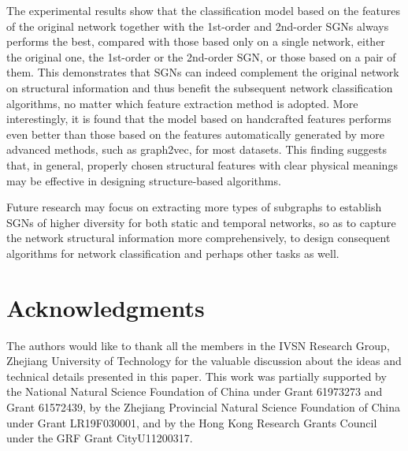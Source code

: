 \documentclass[10pt,journal,compsoc]{IEEEtran}
\begin{document}
The experimental results show that the classification model based on the features of the original network together with the 1st-order and 2nd-order SGNs always performs the best, compared with those based only on a single network, either the original one, the 1st-order or the 2nd-order SGN, or those based on a pair of them. This demonstrates that SGNs can indeed complement the original network on structural information and thus benefit the subsequent network classification algorithms, no matter which feature extraction method is adopted. More interestingly, it is found that the model based on handcrafted features performs even better than those based on the features automatically generated by more advanced methods, such as graph2vec, for most datasets. This finding suggests that, in general, properly chosen structural features with clear physical meanings may be effective in designing structure-based algorithms.

Future research may focus on extracting more types of subgraphs to establish SGNs of higher diversity for both static and temporal networks, so as to capture the network structural information more comprehensively, to design consequent algorithms for network classification and perhaps other tasks as well.


\section*{Acknowledgments}
The authors would like to thank all the members in the IVSN Research Group, Zhejiang University of Technology for the valuable discussion about the ideas and technical details presented in this paper. This work was partially supported by the National Natural Science Foundation of China under Grant 61973273 and Grant 61572439, by the Zhejiang Provincial Natural Science Foundation of China under Grant LR19F030001, and by the Hong Kong Research Grants Council under the GRF Grant CityU11200317.

\ifCLASSOPTIONcaptionsoff
  \newpage
\fi



\end{document}
